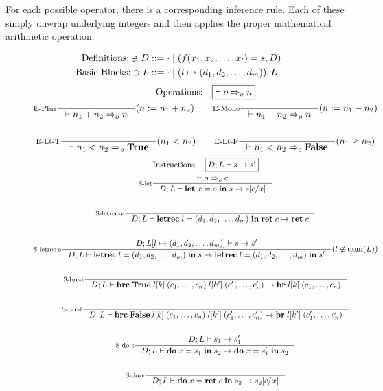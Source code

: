 \documentclass[a4paper, oneside, 10pt, draft]{memoir}
\begin{document}
For each possible operator, there is a corresponding inference
rule. Each of these simply unwrap underlying integers and then applies
the proper mathematical arithmetic operation.
\newcommand{\meval}{:=}
\begin{figure}
  \begin{align*}
    \text{Definitions:} \ni D & ::= \cdot \; \vert \; (f(x_1, x_2, \dotsc,
    x_l) = s, D)\\
    \text{Basic Blocks:} \ni L & ::= \cdot \; \vert \; (l \mapsto (d_1, d_2, \dotsc, d_m)),L
  \end{align*}
  \begin{gather*}
    \text{Operations:} \quad \boxed{|- o \eop n}\\
    \inference[E-Plus]{}{|- n_1 + n_2 \eop n}(n \meval n_1 + n_2)
    \quad \quad
    \inference[E-Mone]{}{|- n_1 - n_2 \eop n}(n \meval n_1 - n_2)\\\\
    \inference[E-Lt-T]{}{|- n_1  < n_2 \eop \btrue}(n_1 < n_2) \quad \quad
    \inference[E-Lt-F]{}{|- n_1  < n_2 \eop \bfalse}(n_1 \geq n_2)
  \end{gather*}
  \begin{gather*}
    \text{Instructions:} \quad \boxed{D;L |- s -> s'}\\
    \inference[S-let]{|- o \eop c}{D;L |- \ilet{x}{o}{s} -> s[c/x]}\\\\
    \inference[S-letrec-v]{}{D;L |- \iletrec{l}{\dbundle}
      {\iret{c}} -> \iret{c}}\\\\
    \inference[S-letrec-s]{D;L[l \mapsto \dbundle] |- s -> s'}
    {D;L |- \iletrec{l}{\dbundle}{s} -> \iletrec{l}{\dbundle}{s'}}(l \not \in \dom{L})\\\\
    \inference[S-brc-t]{}{D;L |-
      \ibrc{\btrue}{\lbl{k}}{(c_1, \dotsc, c_n)}{\lbl{{k'}}}{(c'_1, \dotsc,
        c'_n)} -> \ibr{\lbl{k}}{(c_1, \dotsc, c_n)}}\\\\
    \inference[S-brc-f]{}{D;L |-
      \ibrc{\bfalse}{\lbl{k}}{(c_1, \dotsc, c_n)}{\lbl{{k'}}}{(c'_1, \dotsc, c'_n)} ->
      \ibr{\lbl{{k'}}}{(c'_1, \dotsc, c'_n)}}\\\\
    \inference[S-do-s]{D;L |- s_1 -> s'_1}{D;L |-
      \ido{x}{s_1}{s_2} -> \ido{x}{s'_1}{s_2}}\\\\
    \inference[S-do-v]{}{D;L |- \ido{x}{\iret{c}}{s_2} -> s_2[c/x]}\\\\

\end{gather*}
\end{figure}
\end{document}
